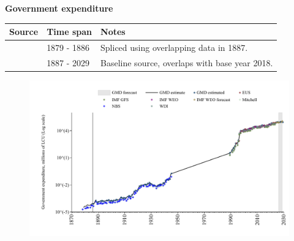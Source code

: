 \documentclass[12pt,a4paper,landscape]{article}
\begin{document}
\begin{adjustbox}{max totalsize={\paperwidth}{\paperheight},center}
\begin{minipage}[t][\textheight][t]{\textwidth}
\vspace*{0.5cm}
{}
\begin{center}
{\Large\bfseries Government expenditure}
\end{center}
\vspace{0.5cm}
\begin{table}[H]
\centering
\small
\begin{tabular}{|l|l|l|}
\hline
\textbf{Source} & \textbf{Time span} & \textbf{Notes} \\
\hline
\rowcolor{white}\cite{NBS}& 1879 - 1886 &Spliced using overlapping data in 1887. \\
\rowcolor{lightgray}\cite{GMD_estimated}& 1887 - 2029 &Baseline source, overlaps with base year 2018. \\
\hline
\end{tabular}
\end{table}
\begin{figure}[H]
\centering
\includegraphics[width=\textwidth,height=0.6\textheight,keepaspectratio]{graphs/BGR_govexp.pdf}
\end{figure}
\end{minipage}
\end{adjustbox}
\end{document}
